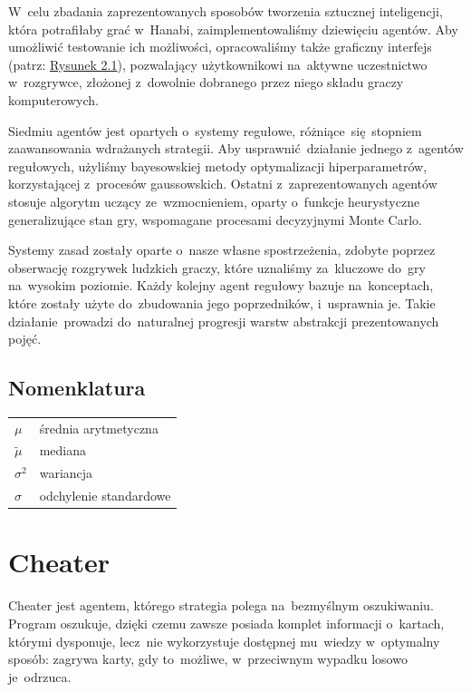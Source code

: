 \documentclass[declaration,shortabstract,inz]{iithesis}
\begin{document}
W~celu zbadania zaprezentowanych sposobów tworzenia sztucznej inteligencji, która potrafiłaby grać w~Hanabi, zaimplementowaliśmy dziewięciu agentów. Aby umożliwić testowanie ich możliwości, opracowaliśmy także graficzny interfejs (patrz: \hyperref[fig:gui]{Rysunek 2.1}), pozwalający użytkownikowi na~aktywne uczestnictwo w~rozgrywce, złożonej z~dowolnie dobranego przez niego składu graczy komputerowych.

Siedmiu agentów jest opartych o~systemy regułowe, różniące~się stopniem zaawansowania wdrażanych strategii. Aby usprawnić działanie jednego z~agentów regułowych, użyliśmy bayesowskiej metody optymalizacji hiperparametrów, korzystającej z~procesów gaussowskich. Ostatni z~zaprezentowanych agentów stosuje algorytm uczący ze~wzmocnieniem, oparty o~funkcje heurystyczne generalizujące stan gry, wspomagane procesami decyzyjnymi Monte Carlo.

Systemy zasad zostały oparte o~nasze własne spostrzeżenia, zdobyte poprzez obserwację rozgrywek ludzkich graczy, które uznaliśmy za~kluczowe do~gry na~wysokim poziomie. Każdy kolejny agent regułowy bazuje na~konceptach, które zostały użyte do~zbudowania jego poprzedników, i~usprawnia je. Takie działanie~prowadzi do~naturalnej progresji warstw abstrakcji prezentowanych pojęć.

\subsection*{Nomenklatura}

\begin{tabular}{@{}>{$}l<{$}@{ --- }l@{}}
	\mu & średnia arytmetyczna \\
	\tilde{\mu} & mediana \\
	\sigma^2 & wariancja \\
	\sigma & odchylenie standardowe \\
\end{tabular}

\newpage

\section{Cheater}

Cheater jest agentem, którego strategia polega na~bezmyślnym oszukiwaniu. Program oszukuje, dzięki czemu zawsze posiada komplet informacji o~kartach, którymi dysponuje, lecz~nie wykorzystuje dostępnej mu~wiedzy w~optymalny sposób: zagrywa karty, gdy to~możliwe, w~przeciwnym wypadku losowo je~odrzuca.
\end{document}
